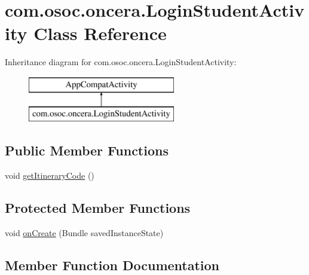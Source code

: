 \hypertarget{classcom_1_1osoc_1_1oncera_1_1_login_student_activity}{}\section{com.\+osoc.\+oncera.\+Login\+Student\+Activity Class Reference}
\label{classcom_1_1osoc_1_1oncera_1_1_login_student_activity}
Inheritance diagram for com.\+osoc.\+oncera.\+Login\+Student\+Activity\+:\begin{figure}[H]
\begin{center}
\leavevmode
\includegraphics[height=2.000000cm]{classcom_1_1osoc_1_1oncera_1_1_login_student_activity}
\end{center}
\end{figure}
\subsection*{Public Member Functions}
\begin{DoxyCompactItemize}
\item 
void \mbox{\hyperlink{classcom_1_1osoc_1_1oncera_1_1_login_student_activity_a54626a0db0855f2dcbeb0ab14ac29c33}{get\+Itinerary\+Code}} ()
\end{DoxyCompactItemize}
\subsection*{Protected Member Functions}
\begin{DoxyCompactItemize}
\item 
void \mbox{\hyperlink{classcom_1_1osoc_1_1oncera_1_1_login_student_activity_a850567ad9113c6e66049f0c1d875723c}{on\+Create}} (Bundle saved\+Instance\+State)
\end{DoxyCompactItemize}


\subsection{Member Function Documentation}
\mbox{\label{classcom_1_1osoc_1_1oncera_1_1_login_student_activity_a54626a0db0855f2dcbeb0ab14ac29c33}} 
